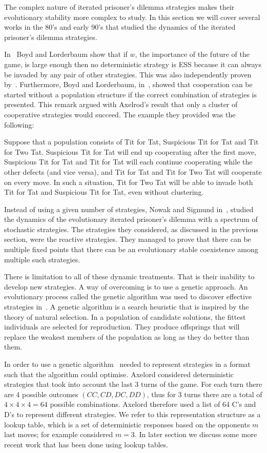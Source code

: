\documentclass{article}
\theoremstyle{definition}
\begin{document}
The complex nature of iterated prisoner's dilemma strategies makes their evolutionary
stability more complex to study. In this section we will cover several works in
the 80's and early 90's that
studied the dynamics of the iterated prisoner's dilemma strategies.

In~\cite{Boyd1987} Boyd and Lorderbaum show that if \(w\), the importance of the
future of the game, is large enough then no deterministic strategy is ESS because
it can always be invaded by any pair of other strategies.
This was also independently proven by~\cite{Pudaite1987}.
Furthermore, Boyd and Lorderbaum, in~\cite{Boyd1989}, showed that cooperation can
be started without a population structure if the correct combination of strategies
is presented. This remark argued with Axelrod's result that only a cluster of
cooperative strategies would succeed. The example they provided was the following:

Suppose that a population consists of Tit for Tat, Suspicious Tit for Tat and
Tit for Two Tat. Suspicious Tit for Tat will end up cooperating after the first
move, Suspicious Tit for Tat and Tit for Tat will each continue cooperating while
the other defects (and vice versa), and Tit for Tat and Tit for Two Tat will cooperate
on every move. In such a situation, Tit for Two Tat will be able to invade both
Tit for Tat and Suspicious Tit for Tat, even without clustering.

Instead of using a given number of strategies, Nowak and Sigmund in~\cite{nowak1989},
studied the dynamics of the evolutionary
iterated prisoner's dilemma with a spectrum of stochastic strategies.
The strategies they considered, as discussed in the previous section, were the reactive
strategies. They managed to prove that there can be multiple fixed points that
there can be an evolutionary stable coexistence among multiple such strategies.

There is limitation to all of these  dynamic treatments. That is their inability
to develop new strategies. A way of overcoming  is to use a genetic approach.
An evolutionary process called the genetic algorithm was used to discover
effective strategies in~\cite{Axelrod1987}. A genetic algorithm is a search heuristic
that is inspired by the theory of natural selection. In a population of candidate
solutions, the fittest individuals are selected for reproduction. They
produce offsprings that will replace the weakest members of the population as long
as they do better than them.

In order to use a genetic algorithm~\cite{Axelrod1987} needed to represent strategies
in a format such that the algorithm could optimise. Axelord considered deterministic
strategies that took into account the last 3 turns of the game. For each turn
there are 4 possible outcomes \((CC, CD, DC, DD)\), thus for 3 turns there are a total
of \(4\times4\times4=64\) possible combinations. Axelord therefore used a list of 64 C's and D's
to represent different strategies. We refer to this representation structure as a
lookup table, which is a set of deterministic responses based on
the opponents \(m\) last moves; for example \cite{Axelrod1987} considered \(m=3\).
In later section we discuss some more recent work that has been done using lookup
tables.
\end{document}
